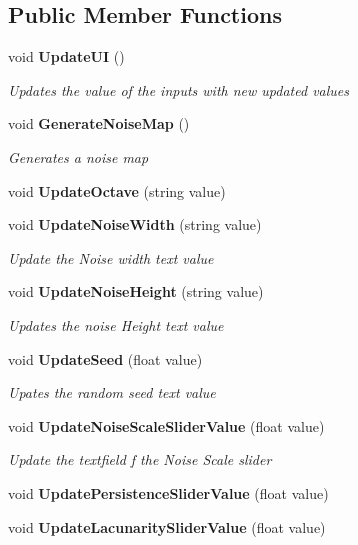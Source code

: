 \subsection*{Public Member Functions}
\begin{DoxyCompactItemize}
\item 
void \textbf{ Update\+UI} ()
\begin{DoxyCompactList}\small\item\em Updates the value of the inputs with new updated values \end{DoxyCompactList}\item 
void \textbf{ Generate\+Noise\+Map} ()
\begin{DoxyCompactList}\small\item\em Generates a noise map \end{DoxyCompactList}\item 
void \textbf{ Update\+Octave} (string value)
\item 
void \textbf{ Update\+Noise\+Width} (string value)
\begin{DoxyCompactList}\small\item\em Update the Noise width text value \end{DoxyCompactList}\item 
void \textbf{ Update\+Noise\+Height} (string value)
\begin{DoxyCompactList}\small\item\em Updates the noise Height text value \end{DoxyCompactList}\item 
void \textbf{ Update\+Seed} (float value)
\begin{DoxyCompactList}\small\item\em Upates the random seed text value \end{DoxyCompactList}\item 
void \textbf{ Update\+Noise\+Scale\+Slider\+Value} (float value)
\begin{DoxyCompactList}\small\item\em Update the textfield f the Noise Scale slider \end{DoxyCompactList}\item 
void \textbf{ Update\+Persistence\+Slider\+Value} (float value)
\item 
void \textbf{ Update\+Lacunarity\+Slider\+Value} (float value)
\end{DoxyCompactItemize}
